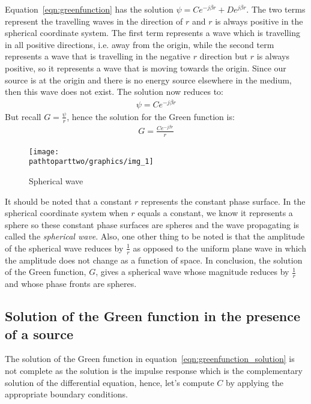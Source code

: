 Equation~\eqref{eqn:greenfunction} has the solution $\psi = Ce^{-j\beta r} + De^{j\beta r}$. The two terms represent the travelling waves in the direction of $r$ and $r$ is always positive in the spherical coordinate system. The first term represents a wave which is travelling in all positive directions, i.e. away from the origin, while the second term represents a wave that is travelling in the negative $r$ direction but $r$ is always positive, so it represents a wave that is moving towards the origin. Since our source is at the origin and there is no energy source elsewhere in the medium, then this wave does not exist. The solution now reduces to:
\begin{align*}
\psi = Ce^{-j\beta r}
\end{align*}
But recall $G = \frac{\psi}{r}$, hence the solution for the Green function is:
\begin{align}
G = \frac{Ce^{-j\beta r}}{r}
\label{eqn:greenfunction_solution}
\end{align}
\begin{figure}[h]
\centering
\texttt{[image: \\pathtoparttwo/graphics/img\_1]}
\caption{Spherical wave}
\label{fig:sphericalwave}
\end{figure}

It should be noted that a constant $r$ represents the constant phase surface. In the spherical coordinate system when $r$ equals a constant, we know it represents a sphere so these constant phase surfaces are spheres and the wave propagating is called the \emph{spherical wave}. Also, one other thing to be noted is that the amplitude of the spherical wave reduces by $\frac{1}{r}$ as opposed to the uniform plane wave in which the amplitude does not change as a function of space. In conclusion, the solution of the Green function, $G$, gives a spherical wave whose magnitude reduces by  $\frac{1}{r}$ and whose phase fronts are spheres.

\subsection{Solution of the Green function in the presence of a source}
The solution of the Green function in equation~\eqref{eqn:greenfunction_solution} is not complete as the solution is the impulse response which is the complementary solution of the differential equation, hence, let's compute $C$ by applying the appropriate boundary conditions.

